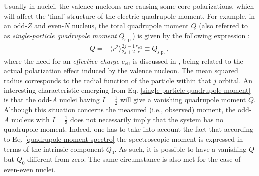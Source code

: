 Usually in nuclei, the valence nucleons are causing some core polarizations, which will affect the `final' structure of the electric quadrupole moment. For example, in an odd-$Z$ and even-$N$ nucleus, the total quadrupole moment $Q$ (also referred to as \emph{single-particle quadrupole moment} $Q_\text{s.p.}$) is given by the following expression \cite{bertulani2007nuclear}:
\begin{align}
    Q=-\langle r^2\rangle\frac{2j-1}{2j+2}\frac{e_\text{eff}}{e}\equiv Q_\text{s.p.}\ ,
    \label{single-particle-quadrupole-moment}
\end{align}
where the need for an \emph{effective charge} $e_\text{eff}$ is discussed in \cite{heyde1994nuclear}, being related to the actual polarization effect induced by the valence nucleon. The mean squared radius corresponds to the radial function of the particle within that $j$ orbital. %
An interesting characteristic emerging from Eq. \ref{single-particle-quadrupole-moment} is that the odd-$A$ nuclei having $I=\frac{1}{2}$ will give a vanishing quadrupole moment $Q$. Although this situation concerns the measured (i.e., observed) moment, the odd-$A$ nucleus with $I=\frac{1}{3}$ does not necessarily imply that the system has no quadrupole moment. Indeed, one has to take into account the fact that according to Eq. \ref{quadrupole-moment-spectro} the spectroscopic moment is expressed in terms of the intrinsic component $Q_0$. As such, it is possible to have a vanishing $Q$ but $Q_0$ different from zero. The same circumstance is also met for the case of even-even nuclei.

